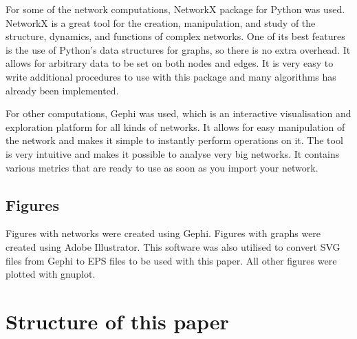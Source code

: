       For some of the network computations, NetworkX package for Python was used. NetworkX is a great tool for the creation, manipulation, and study of the structure, dynamics, and functions of complex networks. One of its best features is the use of Python's data structures for graphs, so there is no extra overhead. It allows for arbitrary data to be set on both nodes and edges. It is very easy to write additional procedures to use with this package and many algorithms has already been implemented.
      
      For other computations, Gephi was used, which is an interactive visualisation and exploration platform for all kinds of networks. It allows for easy manipulation of the network and makes it simple to instantly perform operations on it. The tool is very intuitive and makes it possible to analyse very big networks. It contains various metrics that are ready to use as soon as you import your network.
      
    \subsection{Figures}

      Figures with networks were created using Gephi. Figures with graphs were created using Adobe Illustrator\textregistered. This software was also utilised to convert SVG files from Gephi to EPS files to be used with this paper. All other figures were plotted with gnuplot.
		
  \section{Structure of this paper}

